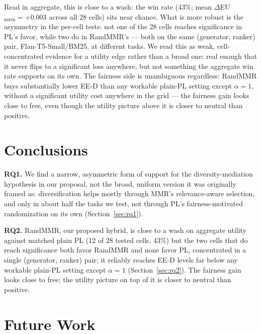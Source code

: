 \documentclass[10pt,twocolumn]{article}
\begin{document}
Read in aggregate, this is close to a wash: the win rate (43\%; mean
$\Delta$EU$_{\text{norm}}{=}{+}0.003$ across all 28 cells) sits near chance. What
is more robust is the asymmetry in the per-cell tests: not one of the 28 cells
reaches significance in PL's favor, while two do in RandMMR's --- both on the same
(generator, ranker) pair, Flan-T5-Small/BM25, at different tasks. We read this as
weak, cell-concentrated evidence for a utility edge rather than a broad one: real
enough that it never flips to a significant loss anywhere, but not something the
aggregate win rate supports on its own. The fairness side is unambiguous
regardless: RandMMR buys substantially lower EE-D than any workable plain-PL
setting except $\alpha{=}1$, without a significant utility cost anywhere in the
grid --- the fairness gain looks close to free, even though the utility picture
above it is closer to neutral than positive.

\FloatBarrier
\section{Conclusions}
\label{sec:conclusion}

\textbf{RQ1.} We find a narrow, asymmetric form of support for the
diversity-mediation hypothesis in our proposal, not the broad, uniform version it was
originally framed as: diversification helps mostly through MMR's relevance-aware
selection, and only in about half the tasks we test, not through PL's
fairness-motivated randomization on its own (Section~\ref{sec:rq1}).

\textbf{RQ2.} RandMMR, our proposed hybrid, is close to a wash on aggregate utility
against matched plain PL (12 of 28 tested cells, 43\%) but the two cells that do
reach significance both favor RandMMR and none favor PL, concentrated in a single
(generator, ranker) pair; it reliably reaches EE-D levels far below any workable
plain-PL setting except $\alpha{=}1$ (Section~\ref{sec:rq2}). The fairness gain
looks close to free; the utility picture on top of it is closer to neutral than
positive.

\section{Future Work}
\label{sec:future}
\end{document}
